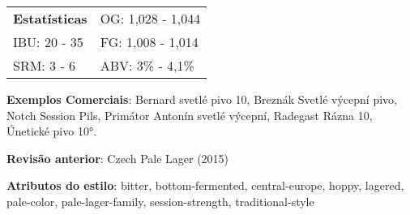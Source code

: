 \begin{tabular}{@{}p{35mm}p{35mm}@{}}
  \textbf{Estatísticas} & OG: 1,028 - 1,044 \\
  IBU: 20 - 35  & FG: 1,008 - 1,014  \\
  SRM: 3 - 6   & ABV: 3\% - 4,1\%
\end{tabular}

\textbf{Exemplos Comerciais}: Bernard svetlé pivo 10, Breznák Svetlé výcepní pivo, Notch Session Pils, Primátor Antonín svetlé výcepní, Radegast Rázna 10, Únetické pivo 10°.

\textbf{Revisão anterior}: Czech Pale Lager (2015)

\textbf{Atributos do estilo}: bitter, bottom-fermented, central-europe, hoppy, lagered, pale-color, pale-lager-family, session-strength, traditional-style
